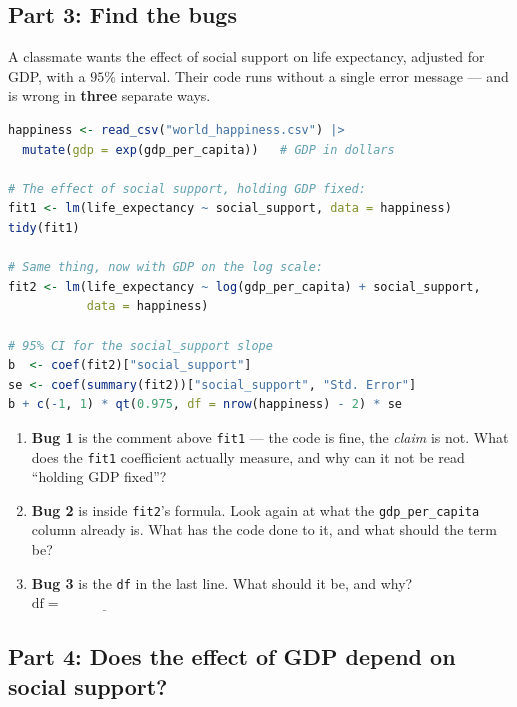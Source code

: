 \documentclass{article}
\newcommand{\blankline}[1]{\underline{\hspace{#1}}}
\begin{document}
\newpage

\subsection*{Part 3: Find the bugs}

A classmate wants the effect of social support on life expectancy, adjusted for GDP, with a $95\%$ interval. Their code runs without a single error message --- and is wrong in \textbf{three} separate ways.

\begin{lstlisting}[language=R]
happiness <- read_csv("world_happiness.csv") |>
  mutate(gdp = exp(gdp_per_capita))   # GDP in dollars

# The effect of social support, holding GDP fixed:
fit1 <- lm(life_expectancy ~ social_support, data = happiness)
tidy(fit1)

# Same thing, now with GDP on the log scale:
fit2 <- lm(life_expectancy ~ log(gdp_per_capita) + social_support,
           data = happiness)

# 95% CI for the social_support slope
b  <- coef(fit2)["social_support"]
se <- coef(summary(fit2))["social_support", "Std. Error"]
b + c(-1, 1) * qt(0.975, df = nrow(happiness) - 2) * se
\end{lstlisting}

\begin{enumerate}[label={\bfseries (\Alph*)},itemsep=.8em]
\item \textbf{Bug 1} is the comment above \texttt{fit1} --- the code is fine, the \emph{claim} is not. What does the \texttt{fit1} coefficient actually measure, and why can it not be read ``holding GDP fixed''? \\[4em]
\item \textbf{Bug 2} is inside \texttt{fit2}'s formula. Look again at what the \texttt{gdp\_per\_capita} column already is. What has the code done to it, and what should the term be? \\[4em]
\item \textbf{Bug 3} is the \texttt{df} in the last line. What should it be, and why? \hfill $\mathrm{df} = \blankline{1in}$ \\[2.5em]
\end{enumerate}

\subsection*{Part 4: Does the effect of GDP depend on social support?}
\end{document}
